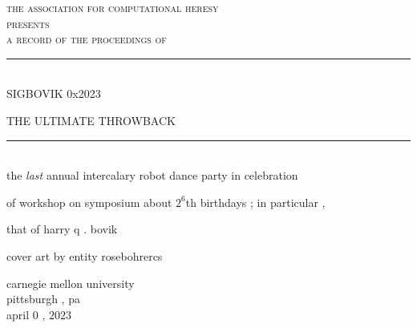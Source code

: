\documentclass{article}
\begin{document}
\setmainfont{Splotch.ttf}
\setsansfont{Birbaslo.ttf}

\newcommand{\HRule}{\rule{\linewidth}{0.5mm}}

\begin{titlepage}
\begin{center}

\textsc{\LARGE the association for computational heresy}\\[0.5cm]

\textsc{\large presents}\\[1cm]

\textsc{\Large a record of the proceedings of}\\[0.5cm]
\HRule \\[0.4cm]
{ \Huge \sf SIGBOVIK 0x2023 \\[0.4cm] }

{ THE ULTIMATE THROWBACK}

\HRule \\[2cm]


the { \em last} annual intercalary robot dance party in celebration

of workshop on symposium about $2^6$th birthdays{ ;} in particular{ ,}

that of harry q{ .} bovik


\vfill

cover art by entity rosebohrercs

\vfill

{\Large carnegie mellon university\\[0.25cm]
pittsburgh{ ,} pa\\[0.3cm]
april $0${ ,} $2023$}

\end{center}
\end{titlepage}
\end{document}
